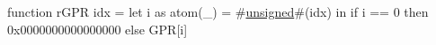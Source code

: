 function rGPR idx = {
         let i as atom(_) = #\hyperref[zunsigned]{unsigned}#(idx) in
         if i == 0 then 0x0000000000000000 else GPR[i]
}
